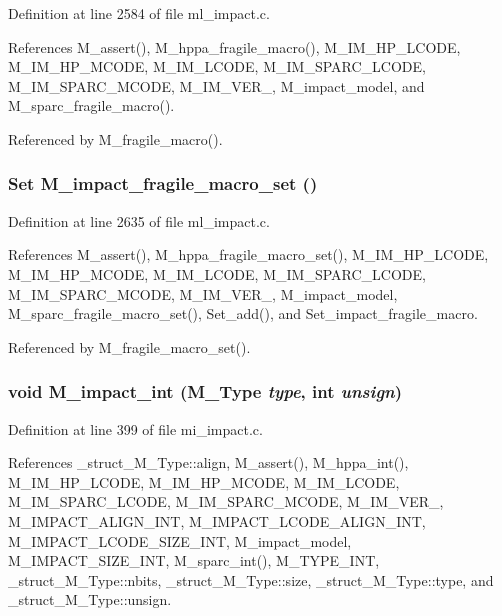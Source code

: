 Definition at line 2584 of file ml\_\-impact.c.

References M\_\-assert(), M\_\-hppa\_\-fragile\_\-macro(), M\_\-IM\_\-HP\_\-LCODE, M\_\-IM\_\-HP\_\-MCODE, M\_\-IM\_\-LCODE, M\_\-IM\_\-SPARC\_\-LCODE, M\_\-IM\_\-SPARC\_\-MCODE, M\_\-IM\_\-VER\_, M\_\-impact\_\-model, and M\_\-sparc\_\-fragile\_\-macro().

Referenced by M\_\-fragile\_\-macro().
\subsubsection{\setlength{\rightskip}{0pt plus 5cm}\bf{Set} M\_\-impact\_\-fragile\_\-macro\_\-set ()}\label{m__impact_8h_fa6740bce46b3248c44a144e1324a1d5}




Definition at line 2635 of file ml\_\-impact.c.

References M\_\-assert(), M\_\-hppa\_\-fragile\_\-macro\_\-set(), M\_\-IM\_\-HP\_\-LCODE, M\_\-IM\_\-HP\_\-MCODE, M\_\-IM\_\-LCODE, M\_\-IM\_\-SPARC\_\-LCODE, M\_\-IM\_\-SPARC\_\-MCODE, M\_\-IM\_\-VER\_, M\_\-impact\_\-model, M\_\-sparc\_\-fragile\_\-macro\_\-set(), Set\_\-add(), and Set\_\-impact\_\-fragile\_\-macro.

Referenced by M\_\-fragile\_\-macro\_\-set().
\subsubsection{\setlength{\rightskip}{0pt plus 5cm}void M\_\-impact\_\-int (\bf{M\_\-Type} {\em type}, int {\em unsign})}\label{m__impact_8h_7c130c32d2c410901e9621468c7d7417}




Definition at line 399 of file mi\_\-impact.c.

References \_\-struct\_\-M\_\-Type::align, M\_\-assert(), M\_\-hppa\_\-int(), M\_\-IM\_\-HP\_\-LCODE, M\_\-IM\_\-HP\_\-MCODE, M\_\-IM\_\-LCODE, M\_\-IM\_\-SPARC\_\-LCODE, M\_\-IM\_\-SPARC\_\-MCODE, M\_\-IM\_\-VER\_, M\_\-IMPACT\_\-ALIGN\_\-INT, M\_\-IMPACT\_\-LCODE\_\-ALIGN\_\-INT, M\_\-IMPACT\_\-LCODE\_\-SIZE\_\-INT, M\_\-impact\_\-model, M\_\-IMPACT\_\-SIZE\_\-INT, M\_\-sparc\_\-int(), M\_\-TYPE\_\-INT, \_\-struct\_\-M\_\-Type::nbits, \_\-struct\_\-M\_\-Type::size, \_\-struct\_\-M\_\-Type::type, and \_\-struct\_\-M\_\-Type::unsign.


